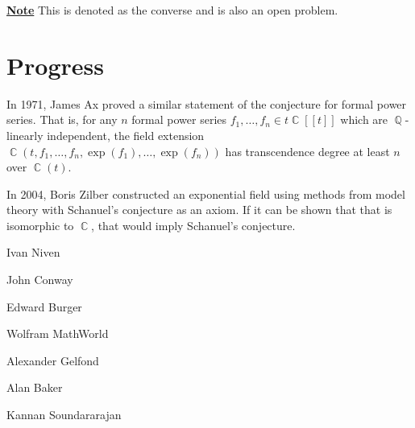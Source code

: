 \documentclass[a4paper, 11pt]{book}
\newcommand{\note}{\underline{\textbf{Note}} }
\DeclareMathOperator{\C}{\mathbb{C}}
\DeclareMathOperator{\Q}{\mathbb{Q}}
\begin{document}
\note{This is denoted as the converse and is also an open problem.}

\newpage
\section{Progress}
In 1971, James Ax proved a similar statement of the conjecture for formal power series. That is, for any $n$ formal power series $f_1, \ldots, f_n \in t\C[[t]]$ which are $\Q$-linearly independent, the field extension $\C(t, f_1, \ldots, f_n, \exp(f_1), \ldots, \exp(f_n))$ has transcendence degree at least $n$ over $\C(t)$.\par

In 2004, Boris Zilber constructed an exponential field using methods from model theory with Schanuel's conjecture as an axiom. If it can be shown that that is isomorphic to $\C$, that would imply Schanuel's conjecture.

\backmatter{}
\printindex
\newpage{}
\begin{thebibliography}{99} %
		\footnotesize %
	
			 Ivan Niven

            John Conway

            Edward Burger 

            Wolfram MathWorld
        
            Alexander Gelfond

            Alan Baker 

            Kannan Soundararajan

	\end{thebibliography} 
\end{document}
